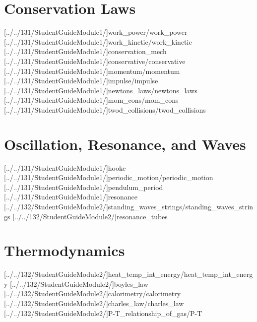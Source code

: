 \documentclass[english,twoside]{labmanual} %
\begin{document}
\part{Conservation Laws}

[../../131/StudentGuideModule1/]{work_power/work_power} %
[../../131/StudentGuideModule1/]{work_kinetic/work_kinetic} %
[../../131/StudentGuideModule1/]{conservation_mech}
[../../131/StudentGuideModule1/]{conservative/conservative} %
[../../131/StudentGuideModule1/]{momentum/momentum} %
[../../131/StudentGuideModule1/]{impulse/impulse} %
[../../131/StudentGuideModule1/]{newtons_laws/newtons_laws} %
[../../131/StudentGuideModule1/]{mom_cons/mom_cons}
[../../131/StudentGuideModule1/]{twod_collisions/twod_collisions}

\part{Oscillation, Resonance, and Waves}

[../../131/StudentGuideModule1/]{hooke}
[../../131/StudentGuideModule1/]{periodic_motion/periodic_motion}
[../../131/StudentGuideModule1/]{pendulum_period}
[../../131/StudentGuideModule1/]{resonance}
[../../132/StudentGuideModule2/]{standing_waves_strings/standing_waves_strings} %
[../../132/StudentGuideModule2/]{resonance_tubes} 

\part{Thermodynamics}

[../../132/StudentGuideModule2/]{heat_temp_int_energy/heat_temp_int_energy}
[../../132/StudentGuideModule2/]{boyles_law}
[../../132/StudentGuideModule2/]{calorimetry/calorimetry}
[../../132/StudentGuideModule2/]{charles_law/charles_law}
[../../132/StudentGuideModule2/]{P-T_relationship_of_gas/P-T}

\end{document}
